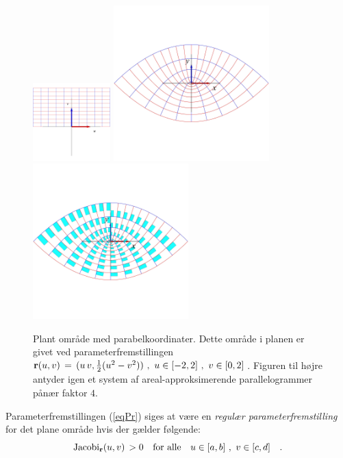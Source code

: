 \begin{figure}[ht]
\centerline{\includegraphics[height=30mm]{FIGS/plot2dParab1} \qquad \includegraphics[height=60mm]{FIGS/plot2dParab2} \qquad \includegraphics[height=60mm]{FIGS/plot2dParab3} }
\begin{center}
\caption{\small{Plant område med parabelkoordinater. Dette område
i planen  er givet ved para\-me\-ter\-frem\-stillingen
${\bf r}(u, v) \, = \, (u\,v, \frac{1}{2}(u^{2} -
v^{2}) ) \,\,, \,\, u \in [-2, 2 ]\,\, , \, \, v
\in [0,2]\,$. Figuren til højre antyder igen et
system af areal-approksimerende parallelogrammer pånær faktor $4$.}}
\label{fig2dParab12}
\end{center}
\end{figure}

\begin{definition} \label{defRegParamPlan}
Parameterfremstillingen (\ref{eqPr}) siges at være en {\em{{regulær parameterfremstilling}}}
for det plane område hvis der gælder følgende:
\begin{equation} \label{eqJacPlanpos}
\operatorname{Jacobi}_{\bf r}(u,v)\, > 0 \quad \text{for alle} \quad  u \in [a,b] \, \,
, \, \,  v \in [c,d] \quad.
\end{equation}
\end{definition}


